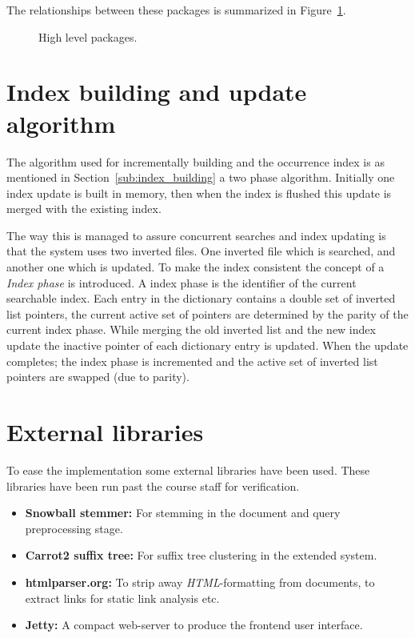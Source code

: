 The relationships between these packages is summarized in Figure~\ref{fig:high_level_packages}. 

\begin{figure}[ht]
	\centering
	\caption{High level packages.}\label{fig:high_level_packages}
\end{figure}

\section{Index building and update algorithm}
The algorithm used for incrementally building and the occurrence index is as mentioned in Section~\ref{sub:index_building} a two phase algorithm. Initially one index update is built in memory, then when the index is flushed this update is merged with the existing index. 

The way this is managed to assure concurrent searches and index updating is that the system uses  two inverted files. One inverted file which is searched, and another one which is updated. To make the index consistent the concept of a \emph{Index phase} is introduced. A index phase is the identifier of the current searchable index. Each entry in the dictionary contains a double set of inverted list pointers, the current active set of pointers are determined by the parity of the current index phase. While merging the old inverted list and the new index update the inactive pointer of each dictionary entry is updated. When the update completes; the index phase is incremented and the active set of inverted list pointers are swapped (due to parity). 

\section{External libraries}\label{sec:external_libraries}
To ease the implementation some external libraries have been used. These libraries have been run past the course staff for verification.

\begin{itemize}
	\item \textbf{Snowball stemmer:} For stemming in the document and query preprocessing stage.
	\item \textbf{Carrot2 suffix tree:} For suffix tree clustering in the extended system. 
	\item \textbf{htmlparser.org:} To strip away \emph{HTML}-formatting from documents, to extract links for static link analysis etc.
	\item \textbf{Jetty:} A compact web-server to produce the frontend user interface. 	 
\end{itemize}